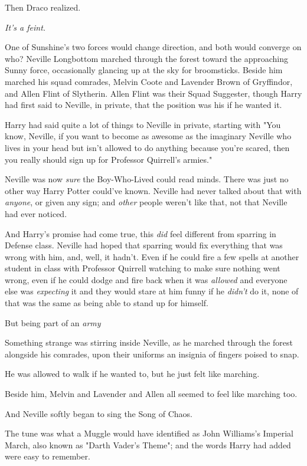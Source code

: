 Then Draco realized.

\emph{It's a feint.}

One of Sunshine's two forces would change direction, and both would converge
on{\el} who?
\sbreak
Neville Longbottom marched through the forest toward the approaching Sunny
force, occasionally glancing up at the sky for broomsticks. Beside him marched
his squad comrades, Melvin Coote and Lavender Brown of Gryffindor, and Allen
Flint of Slytherin. Allen Flint was their Squad Suggester, though Harry had
first said to Neville, in private, that the position was his if he wanted it.

Harry had said quite a lot of things to Neville in private, starting with "You
know, Neville, if you want to become as awesome as the imaginary Neville who
lives in your head but isn't allowed to do anything because you're scared, then
you really should sign up for Professor Quirrell's armies."

Neville was now \emph{sure} the Boy-Who-Lived could read minds. There was just
no other way Harry Potter could've known. Neville had never talked about that
with \emph{anyone}, or given any sign; and \emph{other} people weren't like
that, not that Neville had ever noticed.

And Harry's promise had come true, this \emph{did} feel different from sparring
in Defense class. Neville had hoped that sparring would fix everything that was
wrong with him, and, well, it hadn't. Even if he could fire a few spells at
another student in class with Professor Quirrell watching to make sure nothing
went wrong, even if he could dodge and fire back when it was \emph{allowed} and
everyone else was \emph{expecting} it and they would stare at him funny if he
\emph{didn't} do it, none of that was the same as being able to stand up for
himself.

But being part of an \emph{army{\el}}

Something strange was stirring inside Neville, as he marched through the forest
alongside his comrades, upon their uniforms an insignia of fingers poised to
snap.

He was allowed to walk if he wanted to, but he just felt like marching.

Beside him, Melvin and Lavender and Allen all seemed to feel like marching too.

And Neville softly began to sing the Song of Chaos.

The tune was what a Muggle would have identified as John Williams's Imperial
March, also known as "Darth Vader's Theme"; and the words Harry had added were
easy to remember.

